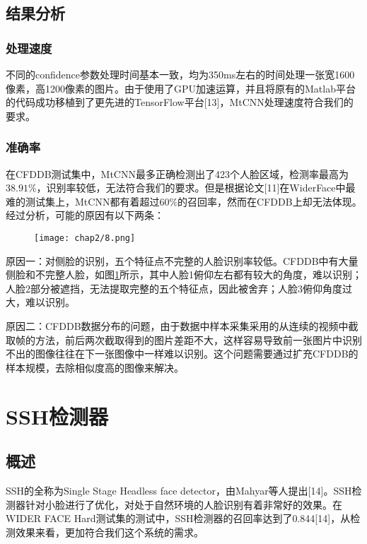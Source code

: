 \subsection{结果分析}

\subsubsection{处理速度}

不同的confidence参数处理时间基本一致，均为350ms左右的时间处理一张宽1600像素，高1200像素的图片。由于使用了GPU加速运算，并且将原有的Matlab平台的代码成功移植到了更先进的TensorFlow平台[13]，MtCNN处理速度符合我们的要求。

\subsubsection{准确率}

在CFDDB测试集中，MtCNN最多正确检测出了423个人脸区域，检测率最高为$38.91\%$，识别率较低，无法符合我们的要求。但是根据论文[11]在WiderFace中最难的测试集上，MtCNN都有着超过$60\%$的召回率，然而在CFDDB上却无法体现。经过分析，可能的原因有以下两条：

\begin{figure}[!htp]
	\centering
	\texttt{[image: chap2/8.png]}
	\label{fig:mtcnn:accr}
\end{figure}


原因一：对侧脸的识别，五个特征点不完整的人脸识别率较低。CFDDB中有大量侧脸和不完整人脸，如图\ref{fig:mtcnn:accr}所示，其中人脸1俯仰左右都有较大的角度，难以识别；人脸2部分被遮挡，无法提取完整的五个特征点，因此被舍弃；人脸3俯仰角度过大，难以识别。


原因二：CFDDB数据分布的问题，由于数据中样本采集采用的从连续的视频中截取帧的方法，前后两次截取得到的图片差距不大，这样容易导致前一张图片中识别不出的图像往往在下一张图像中一样难以识别。这个问题需要通过扩充CFDDB的样本规模，去除相似度高的图像来解决。

\section{SSH检测器}

\subsection{概述}
SSH的全称为Single Stage Headless face detector，由Mahyar等人提出[14]。SSH检测器针对小脸进行了优化，对处于自然环境的人脸识别有着非常好的效果。在WIDER FACE Hard测试集的测试中，SSH检测器的召回率达到了0.844[14]，从检测效果来看，更加符合我们这个系统的需求。

